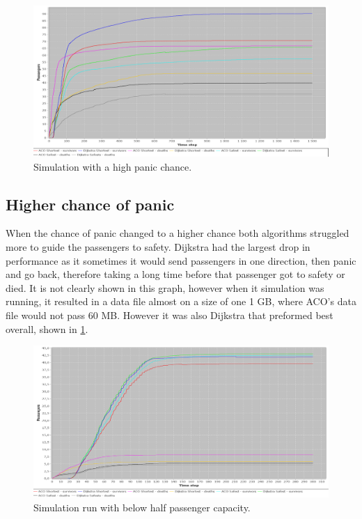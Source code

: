 \begin{figure} [h]
\centering
\hspace*{-1.0in}
\includegraphics[scale=0.35]{images/Graph-using-200-rounds-140-passangers-and-one-fire-high-panic.png}
\caption{Simulation with a high panic chance.}
\label{fig:celebHPanic}
\end{figure}

\subsection{Higher chance of panic}

When the chance of panic changed to a higher chance both algorithms struggled more to guide the passengers to safety. Dijkstra had the largest drop in performance as it sometimes it would send passengers in one direction, then panic and go back, therefore taking a long time before that passenger got to safety or died. It is not clearly shown in this graph, however when it simulation was running, it resulted in a data file almost on a size of one 1 GB, where ACO's data file would not pass 60 MB. However it was also Dijkstra that preformed best overall, shown in \ref{fig:celebHPanic}.

\begin{figure} [h]
\centering
\hspace*{-1.0in}
\includegraphics[scale=0.35]{images/Graph-using-200-rounds-50-passangers.png}
\caption{Simulation run with below half passenger capacity.}
\label{fig:celeb50}
\end{figure}

